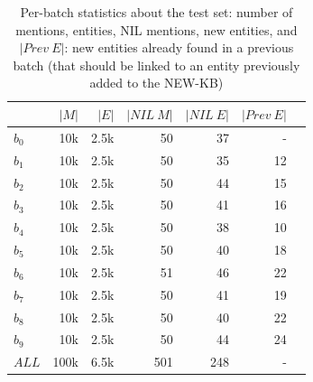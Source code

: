\begin{table}[htbp]
    \centering
    \caption{Per-batch statistics about the test set: number of mentions, entities, NIL mentions, new entities, and $|Prev~E|$: new entities already found in a previous batch (that should be linked to an entity previously added to the NEW-KB)}
    \label{tab:dataset_stats_extended}
\begin{tabular}{l|rrrrrr}
\toprule
{} &  $|M|$ &  $|E|$ &  $|NIL~M|$  &    $|NIL~E|$ &  $|Prev~E|$ \\
\midrule
$b_0$  &          10k &           2.5k &                 50 &                      37 &                                          - &                                          \\
$b_1$  &          10k &           2.5k &                 50 &                      35 &                                         12 &                                          \\
$b_2$  &          10k &           2.5k &                 50 &                      44 &                                         15 &                                          \\
$b_3$  &          10k &           2.5k &                 50 &                      41 &                                         16 &                                          \\
$b_4$  &          10k &           2.5k &                 50 &                      38 &                                         10 &                                          \\
$b_5$  &          10k &           2.5k &                 50 &                      40 &                                         18 &                                          \\
$b_6$  &          10k &           2.5k &                 51 &                      46 &                                         22 &                                          \\
$b_7$  &          10k &           2.5k &                 50 &                      41 &                                         19 &                                          \\
$b_8$  &          10k &           2.5k &                 50 &                      40 &                                         22 &                                          \\
$b_9$  &          10k &           2.5k &                 50 &                      44 &                                         24 &                                          \\
$ALL$ &         100k &           6.5k &                501 &                     248 &                                          - &                                          \\
\bottomrule
\end{tabular}
\end{table}

